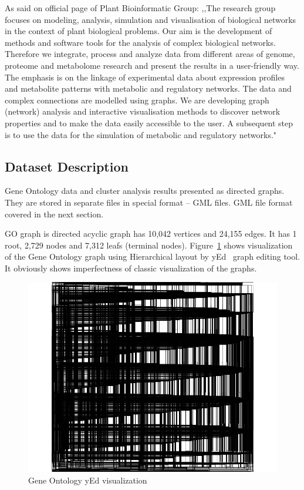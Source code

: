 As said on official page of Plant Bioinformatic Group: ,,The research group focuses on modeling, analysis, simulation and visualisation of biological networks in the context of plant biological problems. Our aim is the development of methods and software tools for the analysis of complex biological networks. Therefore we integrate, process and analyze data from different areas of genome, proteome and
metabolome research and present the results in a user-friendly way. The emphasis is on the linkage of experimental data about expression profiles and metabolite patterns with metabolic and regulatory networks. The data and complex connections are modelled using graphs. We are developing graph (network) analysis and interactive visualisation methods to discover network properties and to make the data easily accessible to the user. A subsequent step is to use the data for the simulation of metabolic and regulatory networks."~\cite{PBG}


\subsection{Dataset Description}
\label{sec:dataset_description}
Gene Ontology data and cluster analysis results presented as directed graphs. They are stored in separate files in special format -- GML files. GML file format covered in the next section.


GO graph is directed acyclic graph has 10,042 vertices and  24,155 edges. It has 1 root, 2,729 nodes and 7,312 leafs (terminal nodes). Figure~\ref{fig:yed_GO_vis} shows visualization of the Gene Ontology graph using Hierarchical layout by yEd~\cite{yed} graph editing tool. It obviously shows imperfectness of classic visualization of the graphs.


\begin{figure}[h!]
\centering
\includegraphics[scale=0.3]{pictures/yEd_GO.png}
\caption{Gene Ontology yEd visualization}
\label{fig:yed_GO_vis}
\end{figure}


